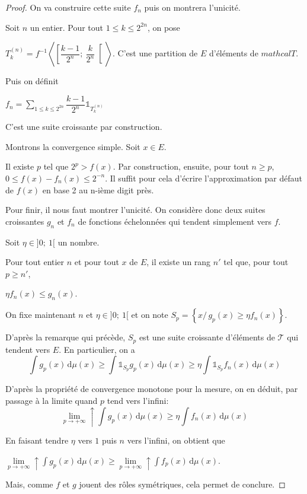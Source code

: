 \begin{proof}
On va construire cette suite $f_n$ puis on montrera l'unicité.

Soit $n$ un entier. Pour tout $1 \leq k \leq 2^{2n}$, on pose 

$T_k^{(n)} = f^{-1}\left<\left[\dfrac{k-1}{2^n};~\dfrac{k}{2^n}\right[\right>$. C'est une partition de $E$ d'éléments de $mathcal{T}$.

Puis on définit

$f_n = \displaystyle{\sum \limits_{1 \leq k \leq 2^{2n}}} \dfrac{k-1}{2^n} \mathbb{1}_{T_k^{(n)}}$

C'est une suite croissante par construction.

Montrons la convergence simple. Soit $x \in E$.

Il existe $p$ tel que $2^{p}>f(x)$. Par construction, ensuite, pour tout $n \geq p$, $0 \leq f(x)-f_n(x) \leq 2^{-n}$. Il suffit pour cela d'écrire l'approximation par défaut de $f(x)$ en base 2 au n-ième digit près.

Pour finir, il nous faut montrer l'unicité. On considère donc deux suites croissantes $g_n$ et $f_n$ de fonctions échelonnées qui tendent simplement vers $f$.

Soit $\eta \in ]0;~1[$ un nombre. 

Pour tout entier $n$ et pour tout $x$ de $E$, il existe un rang $n'$ tel que, pour tout $p \geq n'$, 

$\eta f_n(x) \leq g_n(x)$.

On fixe maintenant $n$ et $\eta \in ]0;~1[$ et on note $S_p = \left \{ x / \, g_p(x) \geq \eta f_n(x)\right \}$.

D'après la remarque qui précède, $S_p$ est une suite croissante d'éléments de $\mathcal{T}$ qui tendent vers $E$. En particulier, on a
\[
\displaystyle{\int} g_p(x)  \,  \mathrm d \mu(x) \geq \displaystyle{\int} \mathbb{1}_{S_p} g_p(x)  \,  \mathrm d \mu(x) \geq \eta \displaystyle{\int} \mathbb{1}_{S_p} f_n(x)  \, \mathrm d \mu(x)
\]

D'après la propriété de convergence monotone pour la mesure, on en déduit, par passage à la limite quand $p$ tend vers l'infini:
\[
\lim \limits_{p \to +\infty} \uparrow \displaystyle{\int} g_p(x)  \,  \mathrm d \mu(x) \geq \eta \displaystyle{\int} f_n(x)  \,  \mathrm d \mu(x)
\]

En faisant tendre $\eta$ vers $1$ puis $n$ vers l'infini, on obtient que 

$\lim \limits_{p \to +\infty} \uparrow \displaystyle{\int} g_p(x)  \,  \mathrm d \mu(x) \geq \lim \limits_{p \to +\infty} \uparrow \displaystyle{\int} f_p(x)  \,  \mathrm d \mu(x)$.

Mais, comme $f$ et $g$ jouent des rôles symétriques, cela permet de conclure.
\end{proof}

